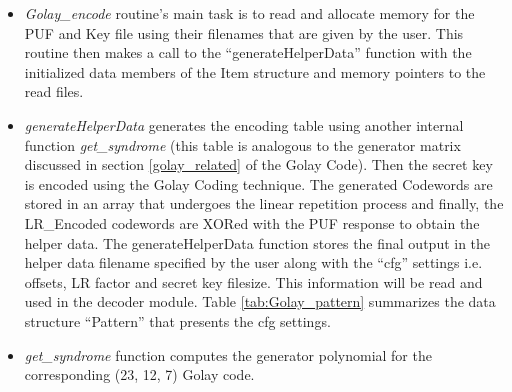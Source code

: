 	\begin{itemize}
		\item \emph{Golay\_encode} routine's main task is to read and allocate memory for the PUF and Key file using their filenames that are given by the user. This routine then makes a call to the ``generateHelperData'' function with the initialized data members of the Item structure and memory pointers to the read files.
		\item \emph{generateHelperData} generates the encoding table using another internal function \emph{get\_syndrome} (this table is analogous to the generator matrix discussed in section \ref{golay_related} of the Golay Code). Then the secret key is encoded using the Golay Coding technique. The generated Codewords are stored in an array that undergoes the linear repetition process and finally, the LR\_Encoded codewords are XORed with the PUF response to obtain the
			helper data. The generateHelperData function stores the final output in the helper data filename specified by the user along with the ``cfg'' settings i.e. offsets, LR factor and secret key filesize. This information will be read and used in the decoder module. Table \ref{tab:Golay_pattern} summarizes the data structure ``Pattern'' that presents the cfg settings.

		\item \emph{get\_syndrome} function computes the generator polynomial for the corresponding (23, 12, 7) Golay code. 
	\end{itemize}

